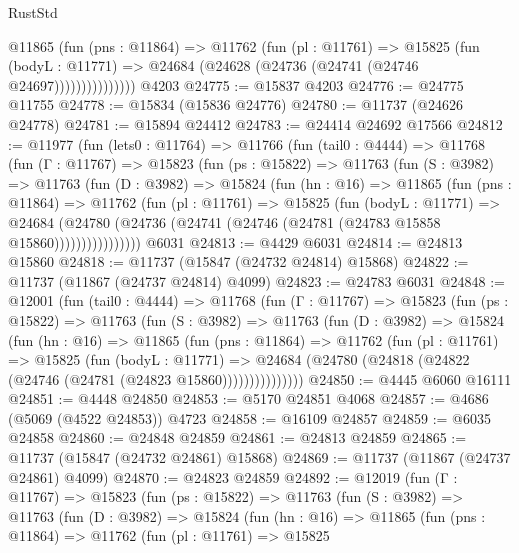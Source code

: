 \begin{lexlean}{RustStd}
\begin{coremodule}
                  @11865
                    (fun (pns : @11864) =>
                    @11762
                      (fun (pl : @11761) =>
                      @15825
                        (fun (bodyL : @11771) =>
                        @24684 (@24628 (@24736 (@24741 (@24746 @24697)))))))))))))))
    @4203
@24775 := @15837 @4203
@24776 := @24775 @11755
@24778 := @15834 (@15836 @24776)
@24780 := @11737 (@24626 @24778)
@24781 := @15894 @24412
@24783 := @24414 @24692 @17566
@24812 := @11977
    (fun (lets0 : @11764) =>
    @11766
      (fun (tail0 : @4444) =>
      @11768
        (fun (Γ : @11767) =>
        @15823
          (fun (ps : @15822) =>
          @11763
            (fun (S : @3982) =>
            @11763
              (fun (D : @3982) =>
              @15824
                (fun (hn : @16) =>
                @11865
                  (fun (pns : @11864) =>
                  @11762
                    (fun (pl : @11761) =>
                    @15825
                      (fun (bodyL : @11771) =>
                      @24684
                        (@24780
                          (@24736 (@24741 (@24746 (@24781 (@24783 @15858 @15860))))))))))))))))
    @6031
@24813 := @4429 @6031
@24814 := @24813 @15860
@24818 := @11737 (@15847 (@24732 @24814) @15868)
@24822 := @11737 (@11867 (@24737 @24814) @4099)
@24823 := @24783 @6031
@24848 := @12001
    (fun (tail0 : @4444) =>
    @11768
      (fun (Γ : @11767) =>
      @15823
        (fun (ps : @15822) =>
        @11763
          (fun (S : @3982) =>
          @11763
            (fun (D : @3982) =>
            @15824
              (fun (hn : @16) =>
              @11865
                (fun (pns : @11864) =>
                @11762
                  (fun (pl : @11761) =>
                  @15825
                    (fun (bodyL : @11771) =>
                    @24684 (@24780 (@24818 (@24822 (@24746 (@24781 (@24823 @15860)))))))))))))))
@24850 := @4445 @6060 @16111
@24851 := @4448 @24850
@24853 := @5170 @24851 @4068
@24857 := @4686 (@5069 (@4522 @24853)) @4723
@24858 := @16109 @24857
@24859 := @6035 @24858
@24860 := @24848 @24859
@24861 := @24813 @24859
@24865 := @11737 (@15847 (@24732 @24861) @15868)
@24869 := @11737 (@11867 (@24737 @24861) @4099)
@24870 := @24823 @24859
@24892 := @12019
    (fun (Γ : @11767) =>
    @15823
      (fun (ps : @15822) =>
      @11763
        (fun (S : @3982) =>
        @11763
          (fun (D : @3982) =>
          @15824
            (fun (hn : @16) =>
            @11865
              (fun (pns : @11864) =>
              @11762
                (fun (pl : @11761) =>
                @15825

\end{coremodule}
\end{lexlean}
